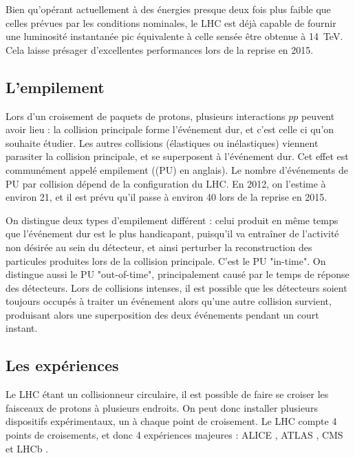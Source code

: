 \bigskip

Bien qu'opérant actuellement à des énergies presque deux fois plus faible que celles prévues par les conditions nominales, le LHC est déjà capable de fournir une luminosité instantanée pic équivalente à celle sensée être obtenue à \SI{14}{\TeV}. Cela laisse présager d'excellentes performances lors de la reprise en 2015.

\subsection{L'empilement}

Lors d'un croisement de paquets de protons, plusieurs interactions $pp$ peuvent avoir lieu : la collision principale forme l'événement dur, et c'est celle ci qu'on souhaite étudier. Les autres collisions (élastiques ou inélastiques) viennent parasiter la collision principale, et se superposent à l'événement dur. Cet effet est communément appelé empilement (\pu (PU) en anglais). Le nombre d'événements de PU par collision dépend de la configuration du LHC. En 2012, on l'estime à environ 21, et il est prévu qu'il passe à environ 40 lors de la reprise en 2015.

\medskip

On distingue deux types d'empilement différent : celui produit en même temps que l'événement dur est le plus handicapant, puisqu'il va entraîner de l'activité non désirée au sein du détecteur, et ainsi perturber la reconstruction des particules produites lors de la collision principale. C'est le PU "in-time". On distingue aussi le PU "out-of-time", principalement causé par le temps de réponse des détecteurs. Lors de collisions intenses, il est possible que les détecteurs soient toujours occupés à traiter un événement alors qu'une autre collision survient, produisant alors une superposition des deux événements pendant un court instant.

\subsection{Les expériences}

Le LHC étant un collisionneur circulaire, il est possible de faire se croiser les faisceaux de protons à plusieurs endroits. On peut donc installer plusieurs dispositifs expérimentaux, un à chaque point de croisement. Le LHC compte 4 points de croisements, et donc 4 expériences majeures : ALICE \citep{alice}, ATLAS \citep{atlas}, CMS \citep{cms} et LHCb \citep{lhcb}.

